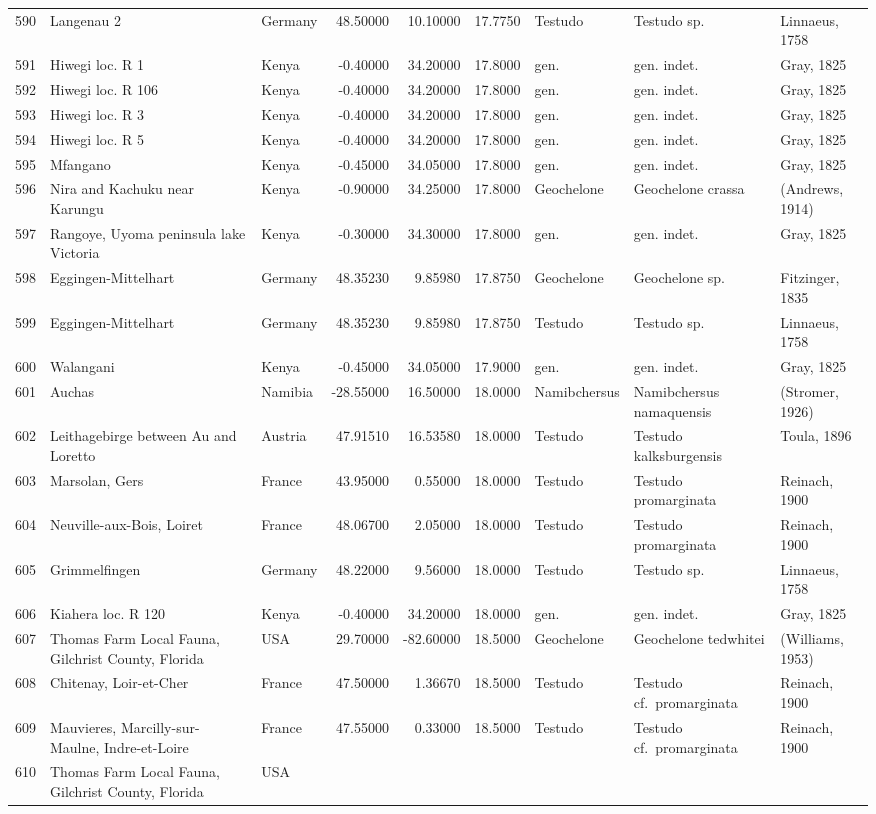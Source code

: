 \begin{landscape}
{\begin{longtable}[]{@{}lllrrrlll@{}}
590 & Langenau 2 & Germany & 48.50000 & 10.10000 & 17.7750 & Testudo &
Testudo sp. & Linnaeus, 1758\tabularnewline
591 & Hiwegi loc. R 1 & Kenya & -0.40000 & 34.20000 & 17.8000 & gen. &
gen. indet. & Gray, 1825\tabularnewline
592 & Hiwegi loc. R 106 & Kenya & -0.40000 & 34.20000 & 17.8000 & gen. &
gen. indet. & Gray, 1825\tabularnewline
593 & Hiwegi loc. R 3 & Kenya & -0.40000 & 34.20000 & 17.8000 & gen. &
gen. indet. & Gray, 1825\tabularnewline
594 & Hiwegi loc. R 5 & Kenya & -0.40000 & 34.20000 & 17.8000 & gen. &
gen. indet. & Gray, 1825\tabularnewline
595 & Mfangano & Kenya & -0.45000 & 34.05000 & 17.8000 & gen. & gen.
indet. & Gray, 1825\tabularnewline
596 & Nira and Kachuku near Karungu & Kenya & -0.90000 & 34.25000 &
17.8000 & Geochelone & Geochelone crassa & (Andrews,
1914)\tabularnewline
597 & Rangoye, Uyoma peninsula lake Victoria & Kenya & -0.30000 &
34.30000 & 17.8000 & gen. & gen. indet. & Gray, 1825\tabularnewline
598 & Eggingen-Mittelhart & Germany & 48.35230 & 9.85980 & 17.8750 &
Geochelone & Geochelone sp. & Fitzinger, 1835\tabularnewline
599 & Eggingen-Mittelhart & Germany & 48.35230 & 9.85980 & 17.8750 &
Testudo & Testudo sp. & Linnaeus, 1758\tabularnewline
600 & Walangani & Kenya & -0.45000 & 34.05000 & 17.9000 & gen. & gen.
indet. & Gray, 1825\tabularnewline
601 & Auchas & Namibia & -28.55000 & 16.50000 & 18.0000 & Namibchersus &
Namibchersus namaquensis & (Stromer, 1926)\tabularnewline
602 & Leithagebirge between Au and Loretto & Austria & 47.91510 &
16.53580 & 18.0000 & Testudo & Testudo kalksburgensis & Toula,
1896\tabularnewline
603 & Marsolan, Gers & France & 43.95000 & 0.55000 & 18.0000 & Testudo &
Testudo promarginata & Reinach, 1900\tabularnewline
604 & Neuville-aux-Bois, Loiret & France & 48.06700 & 2.05000 & 18.0000
& Testudo & Testudo promarginata & Reinach, 1900\tabularnewline
605 & Grimmelfingen & Germany & 48.22000 & 9.56000 & 18.0000 & Testudo &
Testudo sp. & Linnaeus, 1758\tabularnewline
606 & Kiahera loc. R 120 & Kenya & -0.40000 & 34.20000 & 18.0000 & gen.
& gen. indet. & Gray, 1825\tabularnewline
607 & Thomas Farm Local Fauna, Gilchrist County, Florida & USA &
29.70000 & -82.60000 & 18.5000 & Geochelone & Geochelone tedwhitei &
(Williams, 1953)\tabularnewline
608 & Chitenay, Loir-et-Cher & France & 47.50000 & 1.36670 & 18.5000 &
Testudo & Testudo cf.~promarginata & Reinach, 1900\tabularnewline
609 & Mauvieres, Marcilly-sur-Maulne, Indre-et-Loire & France & 47.55000
& 0.33000 & 18.5000 & Testudo & Testudo cf.~promarginata & Reinach,
1900\tabularnewline
610 & Thomas Farm Local Fauna, Gilchrist County, Florida & USA &

\end{longtable}}
\end{landscape}
